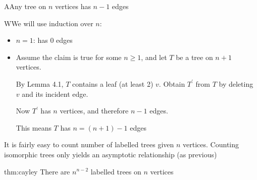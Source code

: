 \par\bigskip
\begin{lem}
  AAny tree on $n$ vertices has $n-1$ edges
\end{lem}
\par\bigskip
\begin{prf}
  WWe will use induction over $n$:\par
  \begin{itemize}
    \item $n=1$: has 0 edges
    \item Assume the claim is true for some $n\geq1$, and let $T$ be a tree on $n+1$ vertices.\par
      By Lemma 4.1, $T$ contains a leaf (at least 2) $v$. Obtain $T^{\prime}$ from $T$ by deleting $v$ and its incident edge.\par
      Now $T^{\prime}$ has $n$ vertices, and therefore $n-1$ edges.\par
      This means $T$ has $n= (n+1)-1$ edges
  \end{itemize}
\end{prf}
\par\bigskip
\noindent It is fairly easy to count number of labelled trees given $n$ vertices. Counting isomorphic trees only yields an asymptotic relationship (as previous)
\par\bigskip
\begin{theo}[Cayley]{thm:cayley}
  There are $n^{n-2}$ labelled trees on $n$ vertices
\end{theo}
\par\bigskip
